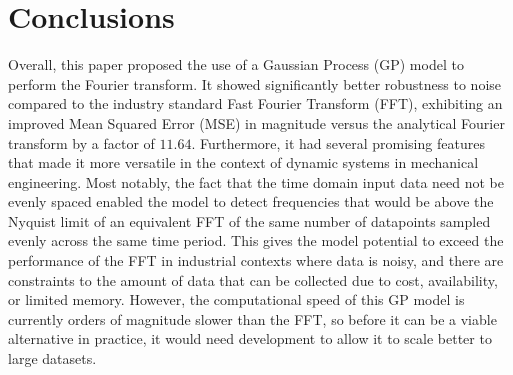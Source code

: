 \documentclass[12pt]{article}
\begin{document}

    \section{Conclusions}
    Overall, this paper proposed the use of a Gaussian Process (GP) model to perform the Fourier transform.
    It showed significantly better robustness to noise compared to the industry standard Fast Fourier Transform (FFT), exhibiting an improved Mean Squared Error (MSE) in magnitude versus the analytical Fourier transform by a factor of $11.64$.
    Furthermore, it had several promising features that made it more versatile in the context of dynamic systems in mechanical engineering.
    Most notably, the fact that the time domain input data need not be evenly spaced enabled the model to detect frequencies that would be above the Nyquist limit of an equivalent FFT of the same number of datapoints sampled evenly across the same time period.
    This gives the model potential to exceed the performance of the FFT in industrial contexts where data is noisy, and there are constraints to the amount of data that can be collected due to cost, availability, or limited memory.
    However, the computational speed of this GP model is currently orders of magnitude slower than the FFT, so before it can be a viable alternative in practice, it would need development to allow it to scale better to large datasets.

    \FloatBarrier

    \newpage
    \printbibliography
    \newpage
    
\end{document}
